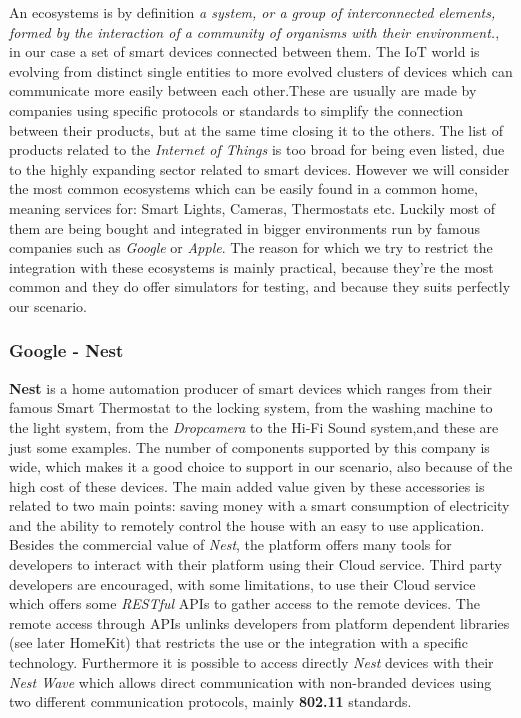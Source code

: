 An ecosystems is by definition \textit{a system, or a group of interconnected elements,
formed by the interaction of a community of organisms with their environment.},
in our case a set of smart devices connected between them. The IoT world is evolving
from distinct single entities to more evolved clusters of devices which can communicate
more easily between each other.These are usually are made by companies using specific protocols or standards
to simplify the connection between their products, but at the same time closing it to the others.
The list of products related to the \textit{Internet of Things} is too broad for
being even listed, due to the highly expanding sector related to smart devices.
However we will consider the most common ecosystems which can be easily found in a common
home, meaning services for: Smart Lights, Cameras, Thermostats etc. Luckily
most of them are being bought and integrated in bigger environments run by
famous companies such as \textit{Google} or \textit{Apple}.
The reason for which we try to restrict the integration with these ecosystems is
mainly practical, because they're the most common and they do offer simulators
for testing, and because they suits perfectly our scenario.

\subsubsection{Google - Nest}

\textbf{Nest} is a home automation producer of smart devices
which ranges from their famous Smart Thermostat to the locking system, from the
washing machine to the light system, from the \textit{Dropcamera} to the Hi-Fi Sound system,and
these are just some examples. The number of components supported by this company
is wide, which makes it a good choice to support in our scenario, also because of
the high cost of these devices. The main added value given by these accessories is related
to two main points: saving money with a smart consumption of electricity and the ability
to remotely control the house with an easy to use application.
Besides the commercial value of \textit{Nest}, the platform offers many tools for developers
to interact with their platform using their Cloud service. Third party developers
are encouraged, with some limitations, to use their Cloud service which
offers some \textit{RESTful} APIs to gather access to the remote devices.
The remote access through APIs unlinks developers from platform dependent libraries (see later HomeKit)
that restricts the use or the integration with a specific technology.
Furthermore it is possible to access directly \textit{Nest} devices with their \textit{Nest Wave}
which allows direct communication with non-branded devices using two different communication protocols,
mainly \textbf{802.11} standards.


